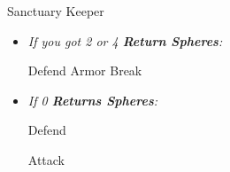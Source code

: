 \bothvfill
\winvfill
\lossvfill
\begin{battle}[40000]{Sanctuary Keeper}
    \begin{itemize}
        \item \textit{If you got 2 or 4 \textbf{Return Spheres}:}
        \begin{itemize}
            \yunaf Defend
            \tidusf Armor Break
        \end{itemize}
        \item \textit{If 0 \textbf{Returns Spheres}:}
        \begin{itemize}
            \tidusf Defend
        \end{itemize}
        \summon{\bahamut}
        \bahamutf Attack
    \end{itemize}
\end{battle}
